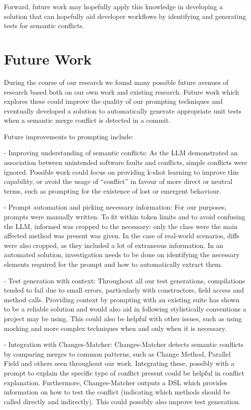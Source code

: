 Forward, future work may hopefully apply this knowledge in developing a solution that can hopefully aid developer workflows by identifying and generating tests for semantic conflicts.

\section{Future Work}

During the course of our research we found many possible future avenues of research based both on our own work and existing research. Future work which explores these could improve
the quality of our prompting techniques and eventually developed a solution to automatically generate appropriate unit tests when a semantic merge conflict is detected in a commit.

Future improvements to prompting include:

- Improving understanding of semantic conflicts: As the LLM demonstrated an association between unintended software faults and conflicts, simple conflicts were ignored.
Possible work could focus on providing k-shot learning to improve this capability, or avoid the usage of ``conflict'' in favour of more direct or neutral terms, such as prompting
for the existence of lost or emergent behaviour.

- Prompt automation and picking necessary information: For our purposes, prompts were manually written. To fit within token limits and to avoid confusing the LLM, informed was cropped to
the necessary: only the class were the main affected method was present was given. In the case of real-world scenarios, diffs were also cropped, as they included a lot of extraneous information.
In an automated solution, investigation needs to be done on identifying the necessary elements required for the prompt and how to automatically extract them.

- Test generation with context: Throughout all our test generations, compilations tended to fail due to small errors, particularly with constructors, field access and method calls.
Providing context by prompting with an existing suite has shown to be a reliable solution and would also aid in following stylistically conventions a project may be using.
This could also be helpful with other issues, such as using mocking and more complex techniques when and only when it is necessary.

- Integration with Changes-Matcher: Changes-Matcher detects semantic conflicts by comparing merges to common patterns, such as Change Method, Parallel Field and others
seen throughout our work. Integrating these, possibly with a prompt to explain the specific type of conflict present could be helpful in conflict explanation.
Furthermore, Changes-Matcher outputs a DSL which provides information on how to test the conflict (indicating which methods should be called directly and indirectly). This could possibly
also improve test generation.

